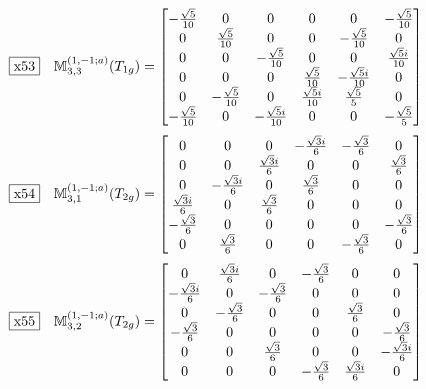 \documentclass[fleqn,10pt,landscape]{jsarticle}
\begin{document}
\begin{dmath*}
\fbox{x53}\quad \mathbb{M}_{3,3}^{(1,-1;a)}(T_{1g})=\begin{bmatrix} - \frac{\sqrt{5}}{10} & 0 & 0 & 0 & 0 & - \frac{\sqrt{5}}{10} \\ 0 & \frac{\sqrt{5}}{10} & 0 & 0 & - \frac{\sqrt{5}}{10} & 0 \\ 0 & 0 & - \frac{\sqrt{5}}{10} & 0 & 0 & \frac{\sqrt{5} i}{10} \\ 0 & 0 & 0 & \frac{\sqrt{5}}{10} & - \frac{\sqrt{5} i}{10} & 0 \\ 0 & - \frac{\sqrt{5}}{10} & 0 & \frac{\sqrt{5} i}{10} & \frac{\sqrt{5}}{5} & 0 \\ - \frac{\sqrt{5}}{10} & 0 & - \frac{\sqrt{5} i}{10} & 0 & 0 & - \frac{\sqrt{5}}{5} \end{bmatrix}
\end{dmath*}
\begin{dmath*}
\fbox{x54}\quad \mathbb{M}_{3,1}^{(1,-1;a)}(T_{2g})=\begin{bmatrix} 0 & 0 & 0 & - \frac{\sqrt{3} i}{6} & - \frac{\sqrt{3}}{6} & 0 \\ 0 & 0 & \frac{\sqrt{3} i}{6} & 0 & 0 & \frac{\sqrt{3}}{6} \\ 0 & - \frac{\sqrt{3} i}{6} & 0 & \frac{\sqrt{3}}{6} & 0 & 0 \\ \frac{\sqrt{3} i}{6} & 0 & \frac{\sqrt{3}}{6} & 0 & 0 & 0 \\ - \frac{\sqrt{3}}{6} & 0 & 0 & 0 & 0 & - \frac{\sqrt{3}}{6} \\ 0 & \frac{\sqrt{3}}{6} & 0 & 0 & - \frac{\sqrt{3}}{6} & 0 \end{bmatrix}
\end{dmath*}
\begin{dmath*}
\fbox{x55}\quad \mathbb{M}_{3,2}^{(1,-1;a)}(T_{2g})=\begin{bmatrix} 0 & \frac{\sqrt{3} i}{6} & 0 & - \frac{\sqrt{3}}{6} & 0 & 0 \\ - \frac{\sqrt{3} i}{6} & 0 & - \frac{\sqrt{3}}{6} & 0 & 0 & 0 \\ 0 & - \frac{\sqrt{3}}{6} & 0 & 0 & \frac{\sqrt{3}}{6} & 0 \\ - \frac{\sqrt{3}}{6} & 0 & 0 & 0 & 0 & - \frac{\sqrt{3}}{6} \\ 0 & 0 & \frac{\sqrt{3}}{6} & 0 & 0 & - \frac{\sqrt{3} i}{6} \\ 0 & 0 & 0 & - \frac{\sqrt{3}}{6} & \frac{\sqrt{3} i}{6} & 0 \end{bmatrix}
\end{dmath*}
\end{document}
